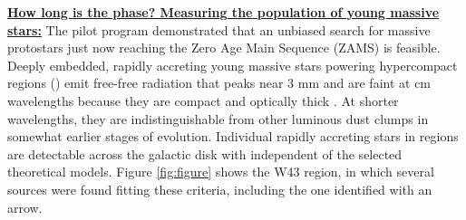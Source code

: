 \documentclass[11pt,preprint]{aastex_nofoot}
\begin{document}
% 
% 




\underline{\textbf{\helv How long is the \hchii phase?  Measuring the population of young massive stars:}}
The pilot program demonstrated that an unbiased search for massive protostars
just now reaching the Zero Age Main Sequence (ZAMS) is feasible.  Deeply
embedded, rapidly accreting young massive stars powering hypercompact \hii
regions (\hchii) emit free-free radiation that peaks near 3 mm and are faint at
cm wavelengths because they are compact and optically thick \citep[e.g.,
G20.08N][]{Galvan-Madrid2009a}.  At shorter wavelengths, they are
indistinguishable from other luminous dust clumps in somewhat earlier stages of
evolution.  Individual rapidly accreting stars in \hchii regions are
detectable across the galactic disk with \MGPS independent of the selected
theoretical models.  Figure \ref{fig:figure} shows the W43 region, in which
several sources were found fitting these criteria, including the one identified
with an arrow.
\end{document}

